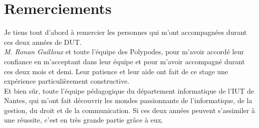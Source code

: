 \section*{Remerciements}

Je tiens tout d'abord à remercier les personnes qui m'ont accompagnées durant ces deux années de DUT.\\

\textit{M. Ronan Guilloux} et toute l'équipe des Polypodes, pour m'avoir accordé leur confiance en m'acceptant dans leur équipe et pour m'avoir accompagné durant ces deux mois et demi. Leur patience et leur aide ont fait de ce stage une expérience particulièrement constructive.\\

Et bien sûr, toute l'équipe pédagogique du département informatique de l'IUT de Nantes, qui m'ont fait découvrir les mondes passionnants de l'informatique, de la gestion, du droit et de la communication. Si ces deux années peuvent s'assimiler à une réussite, c'est en très grande partie grâce à eux.\\

